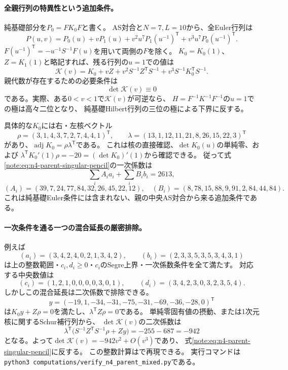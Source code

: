 \documentclass[11pt,a4paper]{ltjsarticle}
\begin{document}
\paragraph{全親行列の特異性という追加条件。}
純基礎部分を$P_0=F K_0F$と書く。
AS対合と$N=7,L=10$から、全Euler行列は
\[
P(u,v)=P_0(u)+vP_1(u)
+v^2u^7P_1(u^{-1})^{\mathsf T}
+v^3u^7P_0(u^{-1})^{\mathsf T}.
\]
$F(u^{-1})^{\mathsf T}=-u^{-1}S^{-1}F(u)$を用いて両側の$F$を除く。
$K_0=K_0(1)$、$Z=K_1(1)$と略記すれば、残る行列の$u=1$での値は
\[
\mathcal K(v)=K_0+vZ+v^2S^{-1}Z^{\mathsf T}S^{-1}
+v^3S^{-1}K_0^{\mathsf T}S^{-1}.
\]
親代数が存在するための必要条件は
\begin{equation}\label{note:eq:n4-parent-singular-pencil}
\det\mathcal K(v)\equiv0
\end{equation}
である。実際、ある$0<v<1$で$\mathcal K(v)$が可逆なら、
$H=F^{-1}K^{-1}F^{-1}$の$u=1$での極は高々二位となり、
純基礎Hilbert行列の三位の極による下界に反する。

具体的な$K_0$には右・左核ベクトル
\[
\rho=(3,1,4,3,7,2,7,4,4,1)^{\mathsf T},\qquad
\lambda=(13,1,12,11,21,8,26,15,22,3)^{\mathsf T}
\]
があり、$\operatorname{adj}K_0=\rho\lambda^{\mathsf T}$である。
これは核の直接確認、$\det K_0(u)$の単純零、および
$\lambda^{\mathsf T}K_0'(1)\rho=-20=(\det K_0)'(1)$から確認できる。
従って式\eqref{note:eq:n4-parent-singular-pencil}の一次係数は
\[
\sum_i A_i a_i+\sum_i B_i b_i=2613,
\]
\[
(A_i)=(39,7,24,77,84,32,26,45,22,12),\quad
(B_i)=(8,78,15,88,9,91,2,84,44,84).
\]
これは純基礎Euler条件には含まれない、親の中央AS対合から来る追加条件である。

\paragraph{一次条件を通る一つの混合延長の厳密排除。}
例えば
\[
(a_i)=(3,4,2,4,0,2,1,3,4,2),\qquad
(b_i)=(2,3,3,5,3,5,3,4,3,1)
\]
は上の整数範囲・$c_i,d_i\ge0$・$c_i$のSegre上界・一次係数条件を全て満たす。
対応する中央数値は
\[
(c_i)=(1,2,1,0,0,0,0,3,0,1),\qquad
(d_i)=(3,4,2,3,0,3,2,3,5,4).
\]
しかしこの混合延長は二次係数で排除できる。
\[
y=(-19,1,-34,-31,-75,-31,-69,-36,-28,0)^{\mathsf T}
\]
は$K_0y+Z\rho=0$を満たし、$\lambda^{\mathsf T}Z\rho=0$である。
単純零固有値の摂動、または1次元核に関するSchur補行列から、
$\det\mathcal K(v)$の二次係数は
\[
\lambda^{\mathsf T}\bigl(S^{-1}Z^{\mathsf T}S^{-1}\rho+Zy\bigr)
=-255-687=-942
\]
となる。よって$\det\mathcal K(v)=-942v^2+O(v^3)$であり、
式\eqref{note:eq:n4-parent-singular-pencil}に反する。
この整数計算はで再現できる。
実行コマンドは\texttt{python3 computations/verify\_n4\_parent\_mixed.py}である。
\end{document}
